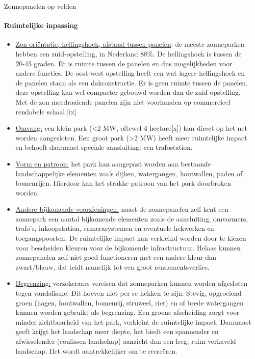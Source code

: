 \begin{voorstel}{Zonnepanelen op velden}
\begin{overwegingen}
\paragraph{Ruimtelijke inpassing}

\begin{itemize}
	\item \underline{Zon oriëntatie, hellingshoek, afstand tussen panelen}: de meeste zonneparken hebben een zuid-opstelling, in Nederland 88\%. De hellingshoek is tussen de 20-45 graden. Er is ruimte tussen de panelen en dus mogelijkheden voor andere functies. De oost-west opstelling heeft een wat lagere hellingshoek en de panelen staan als een dakconstructie. Er is geen ruimte tussen de panelen, deze opstelling kan wel compacter gebouwd worden dan de zuid-opstelling. Met de zon meedraaiende panelen zijn niet voorhanden op commercieel rendabele schaal.[ix]

	\item \underline{Omvang:} een klein park (<2 MW, oftewel 4 hectare[x]) kan direct op het net worden aangesloten. Een groot park (>2 MW) heeft meer ruimtelijke impact en behoeft daarnaast speciale aansluiting: een trafostation.

	\item \underline{Vorm en patroon:} het park kan aangepast worden aan bestaande landschappelijke elementen zoals dijken, watergangen, houtwallen, paden of bomenrijen. Hierdoor kan het strakke patroon van het park doorbroken worden.

	\item \underline{Andere bijkomende voorzieningen:} naast de zonnepanelen zelf kent een zonnepark een aantal bijkomende elementen zoals de aansluiting, omvormers, trafo’s, inkoopstation, camerasystemen en eventuele hekwerken en toegangspoorten. De ruimtelijke impact kan verkleind worden door te kiezen voor bescheiden kleuren voor de bijkomende infrastructuur. Helaas kunnen zonnepanelen zelf niet goed functioneren met een andere kleur dan zwart/blauw, dat leidt namelijk tot een groot rendementsverlies.

	\item \underline{Begrenzing:} verzekeraars vereisen dat zonneparken kunnen worden afgesloten tegen vandalisme. Dit hoeven niet per se hekken te zijn. Stevig, opgroeiend groen (hagen, houtwallen, bomenrij, struweel, riet) en of brede watergangen kunnen worden gebruikt als begrenzing. Een groene afscheiding zorgt voor minder zichtbaarheid van het park, verkleint de ruimtelijke impact. Daarnaast geeft krijgt het landschap meer diepte, het biedt een spannender en afwisselender (coulissen-landschap) aanzicht dan een leeg, ruim verkaveld landschap. Het wordt aantrekkelijker om te recreëren.


\end{itemize}
\end{overwegingen}
\end{voorstel}
